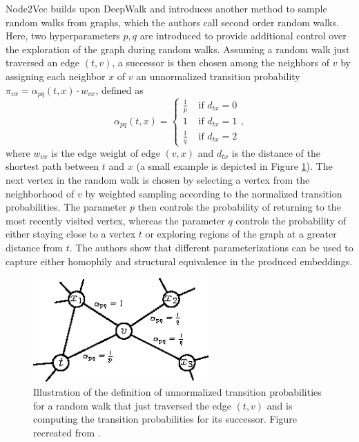 \documentclass[draft,final]{vutinfth} %
\begin{document}
Node2Vec \cite{GroverL16} builds upon DeepWalk and introduces another method to sample random walks from graphs, which the authors call second order random walks. Here, two hyperparameters $p, q$ are introduced to provide additional control over the exploration of the graph during random walks. 
Assuming a random walk just traversed an edge $(t, v)$, a successor is then chosen among the neighbors of $v$ by assigning each neighbor $x$ of $v$ an unnormalized transition probability $\pi_{vx} = \alpha_{pq}(t,x) \cdot w_{vx}$, defined as  
\[
    \alpha_{pq}(t,x) = \begin{cases}
        \frac{1}{p} & \text{ if } d_{tx} = 0 \\
        1 & \text{ if } d_{tx} = 1 \\
        \frac{1}{q} & \text{ if } d_{tx} = 2 
    \end{cases},    
\] 
where $w_{vx}$ is the edge weight of edge $(v,x)$ and $d_{tx}$ is the distance of the shortest path between $t$ and $x$ (a small example is depicted in Figure \ref{fig:node2vec}). The next vertex in the random walk is chosen by selecting a vertex from the neighborhood of $v$ by weighted sampling according to the normalized transition probabilities. 
The parameter $p$ then controls the probability of returning to the most recently visited vertex, whereas the parameter $q$ controls the probability of either staying close to a vertex $t$ or exploring regions of the graph at a greater distance from $t$. The authors show that different parameterizations can be used to capture either homophily and structural equivalence in the produced embeddings. 

\begin{figure}
    \centering
    \includegraphics[width=0.6\textwidth]{graphics/node2vec.eps}
    \caption{Illustration of the definition of unnormalized transition probabilities for a random walk that just traversed the edge $(t,v)$ and is computing the transition probabilities for its successor. Figure recreated from \cite{GroverL16}.}
    \label{fig:node2vec}
\end{figure}
\end{document}
